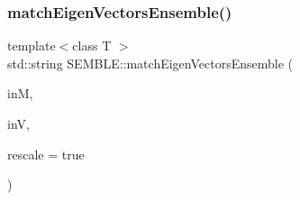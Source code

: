 \subsubsection{\texorpdfstring{matchEigenVectorsEnsemble()}{matchEigenVectorsEnsemble()}\hspace{0.1cm}{\footnotesize\ttfamily [1/2]}}
{\footnotesize\ttfamily template$<$class T $>$ \\
std\+::string S\+E\+M\+B\+L\+E\+::match\+Eigen\+Vectors\+Ensemble (\begin{DoxyParamCaption}\item[{\mbox{\hyperlink{structSEMBLE_1_1SembleMatrix}{Semble\+Matrix}}$<$ T $>$ \&}]{inM,  }\item[{\mbox{\hyperlink{structSEMBLE_1_1SembleVector}{Semble\+Vector}}$<$ double $>$ \&}]{inV,  }\item[{bool}]{rescale = {\ttfamily true} }\end{DoxyParamCaption})}

